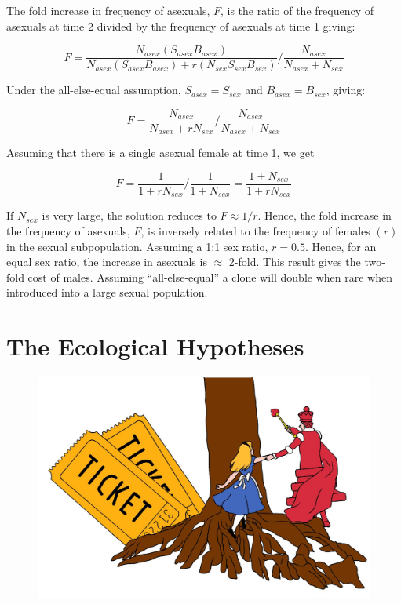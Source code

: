 \documentclass[
  letterpaper,
]{book}
\begin{document}
\begin{tcolorbox}
The fold increase in frequency of asexuals, \(F\), is the ratio of the
frequency of asexuals at time 2 divided by the frequency of asexuals at
time 1 giving:

\[F = \frac{N_{asex}(S_{asex}B_{asex})}{N_{asex}(S_{asex}B_{asex}) + r(N_{sex}S_{sex}B_{sex})}/\frac{N_{asex}}{N_{asex} + N_{sex}}\]

Under the all-else-equal assumption, \(S_{asex} = S_{sex}\) and
\(B_{asex} = B_{sex}\), giving:

\[F = \frac{N_{asex}}{N_{asex} + rN_{sex}}/\frac{N_{asex}}{N_{asex} + N_{sex}}\]

Assuming that there is a single asexual female at time 1, we get

\[F = \frac{1}{1 + rN_{sex}}/\frac{1}{1 + N_{sex}} = \frac{1 + N_{sex}}{1 + rN_{sex}}\]

If \(N_{sex}\) is very large, the solution reduces to \(F \approx 1/r\).
Hence, the fold increase in the frequency of asexuals, \(F\), is
inversely related to the frequency of females \((r)\) in the sexual
subpopulation. Assuming a 1:1 sex ratio, \(r = 0.5\). Hence, for an
equal sex ratio, the increase in asexuals is \(\approx\) 2-fold. This
result gives the two-fold cost of males. Assuming ``all-else-equal'' a
clone will double when rare when introduced into a large sexual
population.

\end{tcolorbox}


\hypertarget{sec-eco-hyp}{%
\chapter{The Ecological Hypotheses}\label{sec-eco-hyp}}

\begin{figure}

{\centering \includegraphics{images/fig2-1.jpeg}

}

\end{figure}
\end{document}
